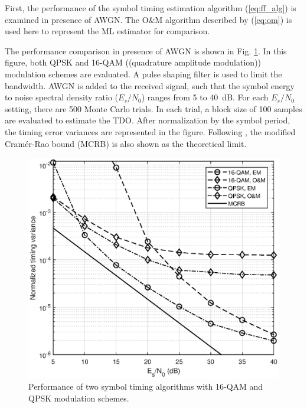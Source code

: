 \documentclass[journal,comsoc]{IEEEtran}
\begin{document}

First, the performance of the symbol timing estimation algorithm (\ref{eq:ff_alg}) is examined in presence of AWGN.
The O\&M algorithm
described by (\ref{eq:om})
is used here to represent the ML estimator for comparison.

The performance comparison in presence of AWGN is shown in Fig. \ref{fig:timing_per}.
In this figure, both QPSK and 16-QAM ((quadrature amplitude modulation)) modulation schemes are evaluated.
A pulse shaping filter is used to limit the bandwidth.
AWGN is added to the received signal, such that the symbol energy to noise spectral density ratio (\(E_s/N_0\)) ranges from 5 to 40~dB. 
For each \(E_s/N_0\) setting, there are 500 Monte Carlo trials.
In each trial, a block size of 100 samples are evaluated to estimate the TDO.
After normalization by the symbol period, the timing error variances are represented in the figure.
Following \cite{mengali1997synchronization}, the modified Cram\'er-Rao bound (MCRB) is also shown as the theoretical limit.

\begin{figure}[ht]
\centering
\includegraphics[width=3 in]{pic/per_timing-k.eps}
\caption{Performance of two symbol timing algorithms with 16-QAM and QPSK modulation schemes.}
\label{fig:timing_per} 
\end{figure}   
\end{document}
